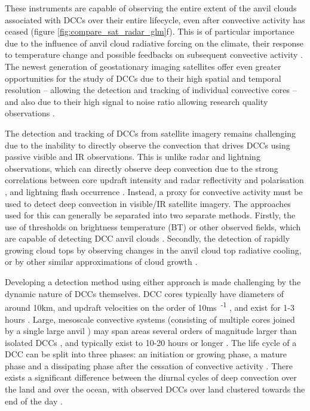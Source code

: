 \documentclass[amt, manuscript]{copernicus}
\begin{document}
These instruments are capable of observing the entire extent of the anvil clouds associated with DCCs over their entire lifecycle, even after convective activity has ceased (figure \ref{fig:compare_sat_radar_glm}f).
This is of particular importance due to the influence of anvil cloud radiative forcing on the climate, their response to temperature change \citep{bony_thermodynamic_2016, hartmann_tropical_2016, ceppi_cloud_2017, gasparini_what_2019} and possible feedbacks on subsequent convective activity \citep{varble_erroneous_2018}.
The newest generation of geostationary imaging satellites offer even greater opportunities for the study of DCCs due to their high spatial and temporal resolution -- allowing the detection and tracking of individual convective cores \citep{heikenfeld_tobac_2019} -- and also due to their high signal to noise ratio allowing research quality observations \citep{iacovazzi_goes-16_2020}.

The detection and tracking of DCCs from satellite imagery remains challenging due to the inability to directly observe the convection that drives DCCs using passive visible and IR observations.
This is unlike radar and lightning observations, which can directly observe deep convection due to the strong correlations between core updraft intensity and radar reflectivity and polarisation \citep{austin_relation_1987, rosenfeld_general_1993, zipser_vertical_1994},  and lightning flash occurrence \citep{williams_relationship_1989, deierling_total_2008, wang_relationship_2017}.
Instead, a proxy for convective activity must be used to detect deep convection in visible/IR satellite imagery.
The approaches used for this can generally be separated into two separate methods. 
Firstly, the use of thresholds on brightness temperature (BT) or other observed fields, which are capable of detecting DCC anvil clouds \citep[e.g.][]{schmetz_monitoring_1997, hong_detection_2005, schroder_deep_2009, liang_integrated_2017, senf_size-resolved_2018}.
Secondly, the detection of rapidly growing cloud tops by observing changes in the anvil cloud top radiative cooling, or by other similar approximations of cloud growth \citep{zinner_cb-tram:_2008, bedka_objective_2010, muller_novel_2019}.

Developing a detection method using either approach is made challenging by the dynamic nature of DCCs themselves.
DCC cores typically have diameters of around 10\unit{km}, and updraft velocities on the order of 10\unit{ms\textsuperscript{-1}} \citep{weisman_mesoscale_2015}, and exist for 1-3 hours \citep{chen_diurnal_1997}.
Large, mesoscale convective systems (consisting of multiple cores joined by a single large anvil \citep{roca_simple_2017}) may span areas several orders of magnitude larger than isolated DCCs \citep{houze_mesoscale_2004}, and typically exist to 10-20 hours or longer \citep{chen_diurnal_1997}.
The life cycle of a DCC can be split into three phases: an initiation or growing phase, a mature phase and a dissipating phase after the cessation of convective activity \citep{wall_life_2018}.
There exists a significant difference between the diurnal cycles of deep convection over the land and over the ocean, with observed DCCs over land clustered towards the end of the day \citep{taylor_evaluating_2017}.
\end{document}

